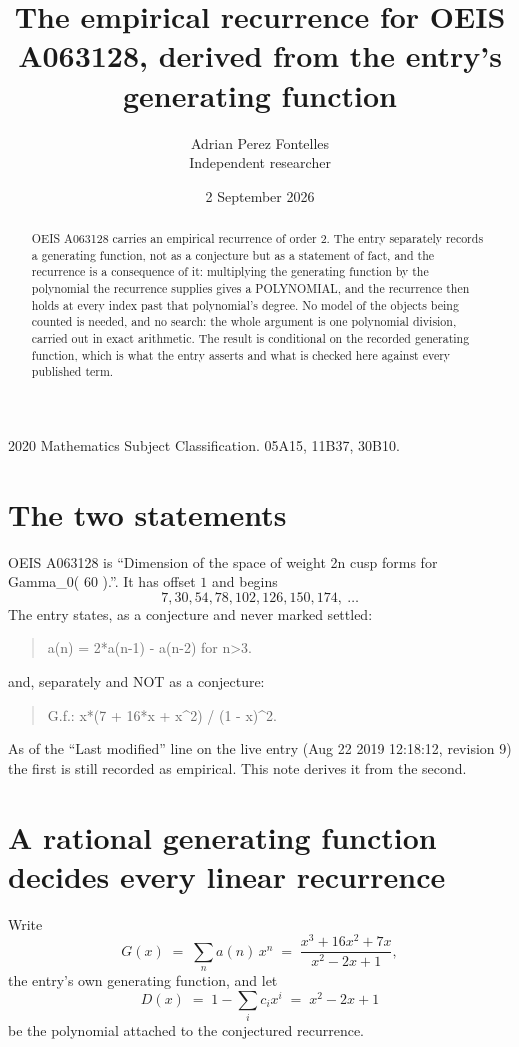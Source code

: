 \documentclass[11pt,a4paper]{article}
\title{The empirical recurrence for OEIS A063128, derived from the entry's generating function}
\author{Adrian Perez Fontelles\\ \small Independent researcher}
\date{2 September 2026}
\theoremstyle{plain}
\theoremstyle{definition}
\begin{document}
\maketitle

\begin{abstract}
OEIS A063128 carries an empirical recurrence of order $2$. The entry separately records a
generating function, not as a conjecture but as a statement of fact, and the recurrence is a
consequence of it: multiplying the generating function by the polynomial the recurrence
supplies gives a POLYNOMIAL, and the recurrence then holds at every index past that
polynomial's degree. No model of the objects being counted is needed, and no search: the
whole argument is one polynomial division, carried out in exact arithmetic. The result is
conditional on the recorded generating function, which is what the entry asserts and what is
checked here against every published term.
\end{abstract}

\noindent\small 2020 Mathematics Subject Classification. 05A15, 11B37, 30B10.\normalsize

\section{The two statements}

OEIS A063128 is ``Dimension of the space of weight 2n cusp forms for Gamma\_0( 60 ).''. It has offset $1$ and begins
\[
7, 30, 54, 78, 102, 126, 150, 174,\ \dots
\]
The entry states, as a conjecture and never marked settled:
\begin{quote}
a(n) = 2*a(n-1) - a(n-2) for n>3.
\end{quote}
and, separately and NOT as a conjecture:
\begin{quote}
G.f.: x*(7 + 16*x + x\^{}2) / (1 - x)\^{}2.
\end{quote}
As of the ``Last modified'' line on the live entry (Aug 22 2019 12:18:12, revision 9) the first is still
recorded as empirical. This note derives it from the second.

\section{A rational generating function decides every linear recurrence}

Write
\[
G(x)\;=\;\sum_{n}a(n)\,x^{n}\;=\;\frac{x^{3} + 16 x^{2} + 7 x}{x^{2} - 2 x + 1},
\]
the entry's own generating function, and let
\[
D(x)\;=\;1-\sum_i c_i x^{i}\;=\;x^{2} - 2 x + 1
\]
be the polynomial attached to the conjectured recurrence.
\end{document}
